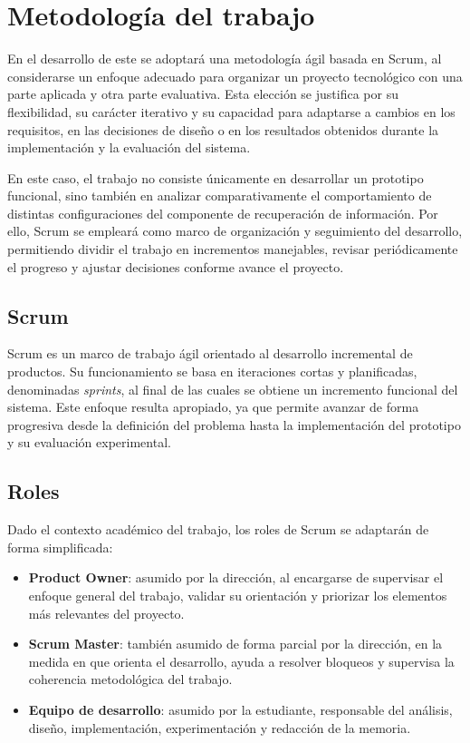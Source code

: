 \section{Metodología del trabajo}\label{sec:metodologia}

En el desarrollo de este se adoptará una metodología ágil basada en Scrum, al considerarse un enfoque adecuado para organizar un proyecto tecnológico con una parte aplicada y otra parte evaluativa. 
Esta elección se justifica por su flexibilidad, su carácter iterativo y su capacidad para adaptarse a cambios en los requisitos, en las decisiones de diseño o en los resultados obtenidos durante la implementación y la evaluación del sistema.

En este caso, el trabajo no consiste únicamente en desarrollar un prototipo funcional, sino también en analizar comparativamente el comportamiento de distintas configuraciones del componente de recuperación de información. 
Por ello, Scrum se empleará como marco de organización y seguimiento del desarrollo, permitiendo dividir el trabajo en incrementos manejables, revisar periódicamente el progreso y ajustar decisiones conforme avance el proyecto.

\subsection{Scrum}

Scrum es un marco de trabajo ágil orientado al desarrollo incremental de productos. 
Su funcionamiento se basa en iteraciones cortas y planificadas, denominadas \textit{sprints}, al final de las cuales se obtiene un incremento funcional del sistema. 
Este enfoque resulta apropiado, ya que permite avanzar de forma progresiva desde la definición del problema hasta la implementación del prototipo y su evaluación experimental.

\subsection{Roles}

Dado el contexto académico del trabajo, los roles de Scrum se adaptarán de forma simplificada:

\begin{itemize}
    \item \textbf{Product Owner}: asumido por la dirección, al encargarse de supervisar el enfoque general del trabajo, validar su orientación y priorizar los elementos más relevantes del proyecto.
    \item \textbf{Scrum Master}: también asumido de forma parcial por la dirección, en la medida en que orienta el desarrollo, ayuda a resolver bloqueos y supervisa la coherencia metodológica del trabajo.
    \item \textbf{Equipo de desarrollo}: asumido por la estudiante, responsable del análisis, diseño, implementación, experimentación y redacción de la memoria.
\end{itemize}

